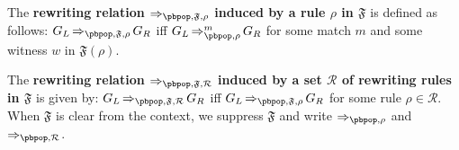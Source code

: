 \begin{definition}
  The \textbf{rewriting relation $\mathop{\Rightarrow}_{\text{\pbpop},\mathfrak{F},\rho} $ induced by a rule $\rho$ in $\mathfrak{F}$} is defined as follows: $G_L \mathop{\Rightarrow}_{\text{\pbpop},\mathfrak{F},\rho} G_R$ iff $G_L \mathop{\Rightarrow}^m_{\text{\pbpop},\rho} G_R$ for some match \(m\) and some witness \(w\) in \(\mathfrak{F}(\rho)\).

    The \textbf{rewriting relation $\mathop{\Rightarrow}_{\text{\pbpop},\mathfrak{F},\mathcal{R}}$ induced by a set $\mathcal{R}$ of \pbpop rewriting rules in $\mathfrak{F}$} is given by: $G_L \mathop{\Rightarrow}_{\text{\pbpop},\mathfrak{F},\mathcal{R}} G_R$ iff $G_L \mathop{\Rightarrow}_{\text{\pbpop},\mathfrak{F},\rho} G_R$ for some rule $\rho \mathop{\in} \mathcal{R}$. When $\mathfrak{F}$ is clear from the context, we suppress $\mathfrak{F}$ and write $\mathop{\Rightarrow}_{\text{\pbpop},\rho}$ and $\mathop{\Rightarrow}_{\text{\pbpop},\mathcal{R}}$.
\end{definition}


